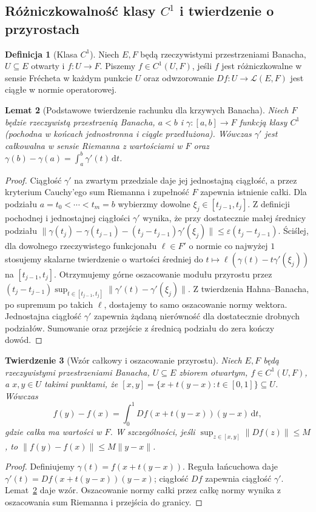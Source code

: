 \documentclass[11pt,a4paper]{article}
\numberwithin{equation}{section}
\theoremstyle{plain}
\newtheorem{twierdzenie}{Twierdzenie}[section]
\newtheorem{lemat}[twierdzenie]{Lemat}
\theoremstyle{definition}
\newtheorem{definicja}[twierdzenie]{Definicja}
\theoremstyle{remark}
\begin{document}
\subsection{Różniczkowalność klasy \texorpdfstring{$C^1$}{C1} i twierdzenie o przyrostach}

\begin{definicja}[Klasa $C^1$]
\label{def:c1-14}
Niech $E,F$ będą rzeczywistymi przestrzeniami Banacha, $U\subseteq E$ otwarty i $f:U\to F$. Piszemy $f\in C^1(U,F)$, jeśli $f$ jest różniczkowalne w sensie Frécheta w każdym punkcie $U$ oraz odwzorowanie $Df:U\to\mathcal L(E,F)$ jest ciągłe w normie operatorowej.
\end{definicja}

\begin{lemat}[Podstawowe twierdzenie rachunku dla krzywych Banacha]
\label{lem:ftc-banach14}
Niech $F$ będzie rzeczywistą przestrzenią Banacha, $a<b$ i $\gamma:[a,b]\to F$ funkcją klasy $C^1$ (pochodna w końcach jednostronna i ciągle przedłużona). Wówczas $\gamma'$ jest całkowalna w sensie Riemanna z wartościami w $F$ oraz
$\gamma(b)-\gamma(a)=\int_a^b\gamma'(t)\,\mathrm dt$.
\end{lemat}
\begin{proof}
Ciągłość $\gamma'$ na zwartym przedziale daje jej jednostajną ciągłość, a przez kryterium Cauchy'ego sum Riemanna i zupełność $F$ zapewnia istnienie całki. Dla podziału $a=t_0<\cdots<t_m=b$ wybierzmy dowolne $\xi_j\in[t_{j-1},t_j]$. Z definicji pochodnej i jednostajnej ciągłości $\gamma'$ wynika, że przy dostatecznie małej średnicy podziału
$\|\gamma(t_j)-\gamma(t_{j-1})-(t_j-t_{j-1})\gamma'(\xi_j)\|\le\varepsilon(t_j-t_{j-1})$.
Ściślej, dla dowolnego rzeczywistego funkcjonału $\ell\in F'$ o normie co najwyżej $1$ stosujemy skalarne twierdzenie o wartości średniej do $t\mapsto\ell(\gamma(t)-t\gamma'(\xi_j))$ na $[t_{j-1},t_j]$. Otrzymujemy górne oszacowanie modułu przyrostu przez $(t_j-t_{j-1})\sup_{t\in[t_{j-1},t_j]}\|\gamma'(t)-\gamma'(\xi_j)\|$. Z twierdzenia Hahna--Banacha, po supremum po takich $\ell$, dostajemy to samo oszacowanie normy wektora. Jednostajna ciągłość $\gamma'$ zapewnia żądaną nierówność dla dostatecznie drobnych podziałów. Sumowanie oraz przejście z średnicą podziału do zera kończy dowód.
\end{proof}

\begin{twierdzenie}[Wzór całkowy i oszacowanie przyrostu]
\label{thm:mean-value14}
Niech $E,F$ będą rzeczywistymi przestrzeniami Banacha, $U\subseteq E$ zbiorem otwartym, $f\in C^1(U,F)$, a $x,y\in U$ takimi punktami, że $[x,y]=\{x+t(y-x):t\in[0,1]\}\subseteq U$. Wówczas
\[
f(y)-f(x)=\int_0^1 Df(x+t(y-x))(y-x)\,\mathrm dt,
\]
gdzie całka ma wartości w $F$. W szczególności, jeśli $\sup_{z\in[x,y]}\|Df(z)\|\le M$, to $\|f(y)-f(x)\|\le M\|y-x\|$.
\end{twierdzenie}
\begin{proof}
Definiujemy $\gamma(t)=f(x+t(y-x))$. Reguła łańcuchowa daje $\gamma'(t)=Df(x+t(y-x))(y-x)$; ciągłość $Df$ zapewnia ciągłość $\gamma'$. Lemat~\ref{lem:ftc-banach14} daje wzór. Oszacowanie normy całki przez całkę normy wynika z oszacowania sum Riemanna i przejścia do granicy.
\end{proof}
\end{document}
